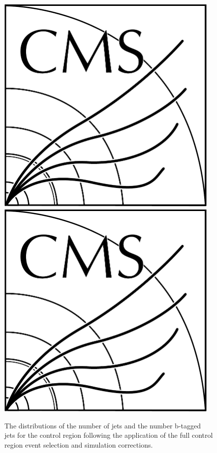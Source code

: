 
\begin{figure}[htb]
\centering
\includegraphics[width=0.97\textwidth]{CMS-bw-logo.pdf}
\\
\includegraphics[width=0.97\textwidth]{CMS-bw-logo.pdf}
\caption{
The distributions of the number of jets and the number b-tagged jets for the \ttbar control region following the application of the full control region event selection and simulation corrections.
}
\label{fig:ttbarCR_nJets}
\end{figure}

